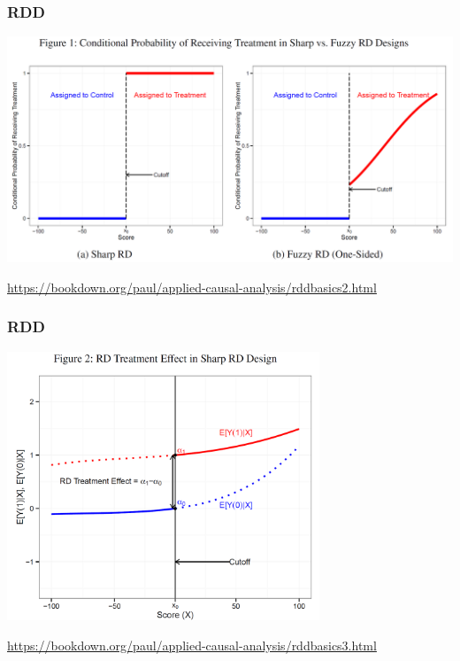 \documentclass[aspectratio=43]{beamer}
\begin{document}
\begin{frame}
\frametitle{RDD}
\centering

\includegraphics[width = \textwidth]{../img/sharp-fuzzy-rd}

\href{https://bookdown.org/paul/applied-causal-analysis/rddbasics2.html}{\scriptsize https://bookdown.org/paul/applied-causal-analysis/rddbasics2.html}

\end{frame}

\begin{frame}
\frametitle{RDD}
\centering

\includegraphics[width = 0.7\textwidth]{../img/rdd_teffect}

\href{https://bookdown.org/paul/applied-causal-analysis/rddbasics3.html}{\scriptsize https://bookdown.org/paul/applied-causal-analysis/rddbasics3.html}

\end{frame}
\end{document}
